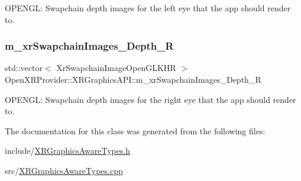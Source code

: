 O\+P\+E\+N\+GL\+: Swapchain depth images for the left eye that the app should render to. 

\mbox{\label{class_open_x_r_provider_1_1_x_r_graphics_a_p_i_aa13dbac8a084165d6340f47693e12128}} 
\subsubsection{\texorpdfstring{m\_xrSwapchainImages\_Depth\_R}{m\_xrSwapchainImages\_Depth\_R}}
{\footnotesize\ttfamily std\+::vector$<$ Xr\+Swapchain\+Image\+Open\+G\+L\+K\+HR $>$ Open\+X\+R\+Provider\+::\+X\+R\+Graphics\+A\+P\+I\+::m\+\_\+xr\+Swapchain\+Images\+\_\+\+Depth\+\_\+R\hspace{0.3cm}{\ttfamily [private]}}



O\+P\+E\+N\+GL\+: Swapchain depth images for the right eye that the app should render to. 



The documentation for this class was generated from the following files\+:\begin{DoxyCompactItemize}
\item 
include/\mbox{\hyperlink{_x_r_graphics_aware_types_8h}{X\+R\+Graphics\+Aware\+Types.\+h}}\item 
src/\mbox{\hyperlink{_x_r_graphics_aware_types_8cpp}{X\+R\+Graphics\+Aware\+Types.\+cpp}}\end{DoxyCompactItemize}
